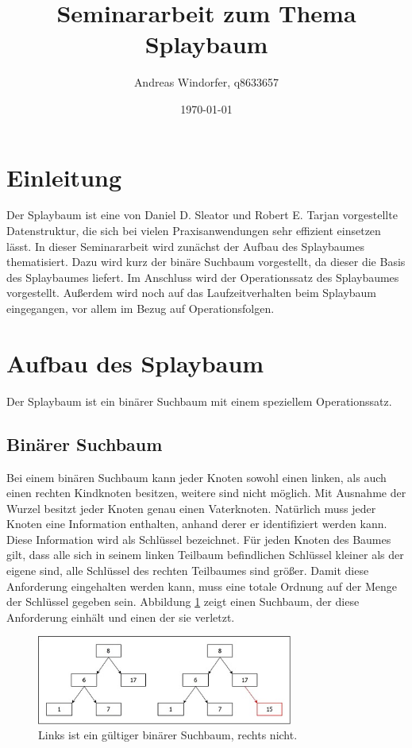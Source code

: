\documentclass[11pt, a4paper]{article}
\title{Seminararbeit zum Thema Splaybaum}
\author{Andreas Windorfer, q8633657}
\date{\today}
\begin{document}
	\maketitle
	\tableofcontents
	\newpage
	
	\section{Einleitung} 
	Der Splaybaum ist eine von Daniel D. Sleator und Robert E. Tarjan vorgestellte Datenstruktur, die sich bei vielen Praxisanwendungen sehr effizient einsetzen lässt. In dieser Seminararbeit wird zunächst der Aufbau des Splaybaumes thematisiert. Dazu wird kurz der binäre Suchbaum vorgestellt, da dieser die Basis des Splaybaumes liefert. Im Anschluss wird der Operationssatz des Splaybaumes vorgestellt. Außerdem wird noch auf das Laufzeitverhalten beim Splaybaum eingegangen, vor allem im  Bezug auf Operationsfolgen.
	
	\section{Aufbau des Splaybaum}
	Der Splaybaum ist ein binärer Suchbaum mit einem speziellem Operationssatz.
	\subsection{Binärer Suchbaum}
	
	Bei einem binären Suchbaum kann jeder Knoten sowohl einen linken, als auch einen rechten Kindknoten besitzen, weitere sind nicht möglich. Mit Ausnahme der Wurzel besitzt jeder Knoten genau einen Vaterknoten. Natürlich muss jeder Knoten eine Information enthalten, anhand derer er identifiziert werden kann. Diese Information wird als \grqq{}Schlüssel\grqq{} bezeichnet. Für jeden Knoten des Baumes gilt, dass alle sich in seinem linken Teilbaum befindlichen Schlüssel kleiner als der eigene sind, alle Schlüssel des rechten Teilbaumes sind größer. Damit diese Anforderung eingehalten werden kann, muss eine totale Ordnung auf der Menge der Schlüssel gegeben sein.  Abbildung \ref{fig:ioNioSuchbaum} zeigt einen Suchbaum, der diese Anforderung einhält und einen der sie verletzt.
	
	\begin{figure}[h]
		\centering
		\includegraphics[width=0.75\textwidth]{"bilder/suchbaumIO_NIO"}
		\caption{Links ist ein gültiger binärer Suchbaum, rechts nicht.}
		\label{fig:ioNioSuchbaum}
	\end{figure}
	
\end{document}
